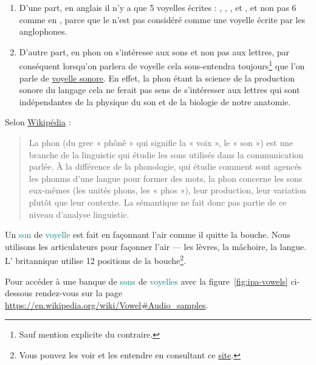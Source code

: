 \documentclass[12pt,a4paper, xetex, hyperref]{book}
\begin{document}
    \begin{enumerate}
    \item D'une part, en anglais il n'y a que 5 voyelles écrites :
      , , ,  et , et non pas 6
      comme en , parce que le  n'est pas  considéré
      comme une voyelle écrite par les anglophones.
    \item D'autre part, en \gls{phon} on s'intéresse aux sons et non pas aux
      lettres, par conséquent lorsqu'on parlera de voyelle cela
      sous-entendra toujours\footnote{Sauf mention explicite du
        contraire.} que l'on parle de \underline{voyelle sonore}. En
      effet, la \gls{phon} étant la science de la production sonore du
      langage cela ne ferait pas sens de s'intéresser aux lettres qui sont
      indépendantes de la physique du son et de la biologie de notre anatomie.
    \end{enumerate}

    Selon
    \href{https://fr.wikipedia.org/wiki/Phon\%C3\%A9tique}{Wikipédia}
    :
    
    \begin{quote}
      La \gls{phon} (du grec « phônê » qui signifie la « voix », le «
      son ») est une branche de la \gls{linguistic} qui étudie les sons
      utilisés dans la communication parlée. À la différence de la
      phonologie, qui étudie comment sont agencés les \glspl{phonm} d'une
      langue pour former des mots, la \gls{phon} concerne les sons
      eux-mêmes (les unités \glspl{phon}, les « \glspl{pho} »), leur
      production, leur variation plutôt que leur contexte. La
      sémantique ne fait donc pas partie de ce niveau d'analyse \gls{linguistic}.
    \end{quote}

    Un \textcolor{teal}{son} de
    \textcolor{teal}{voyelle} 
    est fait en façonnant l'air comme il quitte la bouche. Nous
    utilisons les articulateurs pour façonner l'air --- les lèvres, la
    mâchoire, la langue. L' britannique utilise 12
    positions de la bouche\footnote{Vous pouvez les voir et les
      entendre en consultant ce
      \href{https://pronunciationstudio.com/vowel02/}{site}.}.   

    Pour accéder à une banque de \textcolor{teal}{sons} de
    \textcolor{teal}{voyelles} avec la figure~\ref{fig:ipa-vowels} ci-dessous rendez-vous sur
    la page \url{https://en.wikipedia.org/wiki/Vowel\#Audio_samples}.
\end{document}
